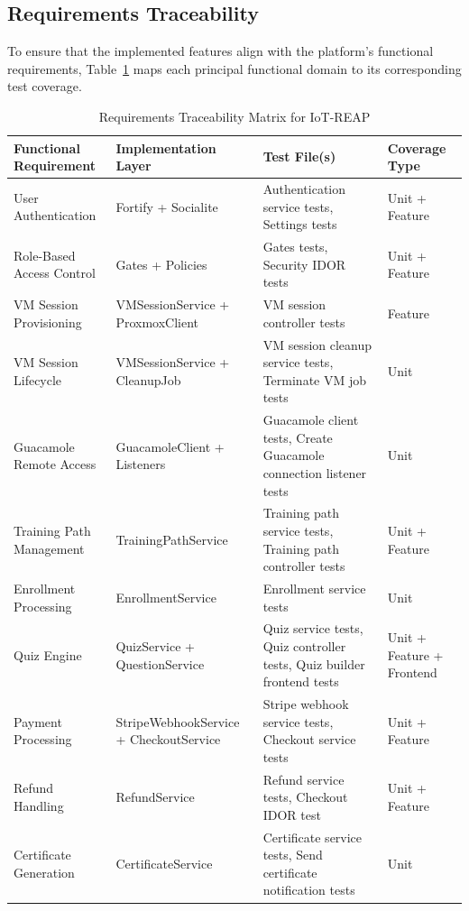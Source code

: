 \subsection{Requirements Traceability}

To ensure that the implemented features align with the platform's functional requirements, Table~\ref{tab:requirements-traceability} maps each principal functional domain to its corresponding test coverage.

\begin{table}[H]
\centering
\caption{Requirements Traceability Matrix for IoT-REAP}
\label{tab:requirements-traceability}
\begin{tabular}{|p{3.5cm}|p{3.5cm}|p{4cm}|p{3.5cm}|}
\hline
\textbf{Functional Requirement} & \textbf{Implementation Layer} & \textbf{Test File(s)} & \textbf{Coverage Type} \\
\hline
User Authentication & Fortify + Socialite & Authentication service tests, Settings tests & Unit + Feature \\
\hline
Role-Based Access Control & Gates + Policies & Gates tests, Security IDOR tests & Unit + Feature \\
\hline
VM Session Provisioning & VMSessionService + ProxmoxClient & VM session controller tests & Feature \\
\hline
VM Session Lifecycle & VMSessionService + CleanupJob & VM session cleanup service tests, Terminate VM job tests & Unit \\
\hline
Guacamole Remote Access & GuacamoleClient + Listeners & Guacamole client tests, Create Guacamole connection listener tests & Unit \\
\hline
Training Path Management & TrainingPathService & Training path service tests, Training path controller tests & Unit + Feature \\
\hline
Enrollment Processing & EnrollmentService & Enrollment service tests & Unit \\
\hline
Quiz Engine & QuizService + QuestionService & Quiz service tests, Quiz controller tests, Quiz builder frontend tests & Unit + Feature + Frontend \\
\hline
Payment Processing & StripeWebhookService + CheckoutService & Stripe webhook service tests, Checkout service tests & Unit + Feature \\
\hline
Refund Handling & RefundService & Refund service tests, Checkout IDOR test & Unit + Feature \\
\hline
Certificate Generation & CertificateService & Certificate service tests, Send certificate notification tests & Unit \\

\end{tabular}
\end{table}
